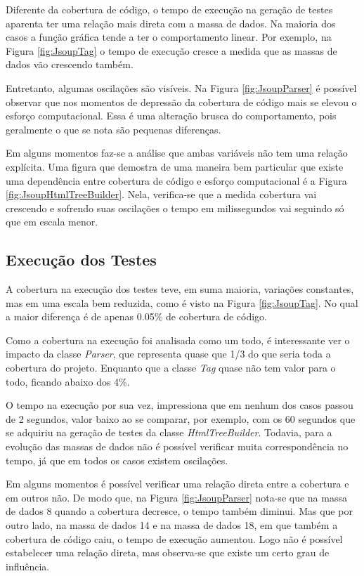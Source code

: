 Diferente da cobertura de código, o tempo de execução na geração de testes aparenta ter uma relação mais direta com a massa de dados. Na maioria dos casos a função gráfica tende a ter o comportamento linear. Por exemplo, na Figura \ref{fig:JsoupTag} o tempo de execução cresce a medida que as massas de dados vão crescendo também.

Entretanto, algumas oscilações são visíveis. Na Figura \ref{fig:JsoupParser} é possível observar que nos momentos de depressão da cobertura de código mais se elevou o esforço computacional. Essa é uma alteração brusca do comportamento, pois geralmente o que se nota são pequenas diferenças.

Em alguns momentos faz-se a análise que ambas variáveis não tem uma relação explícita. Uma figura que demostra de uma maneira bem particular que existe uma dependência entre cobertura de código e esforço computacional é a Figura \ref{fig:JsoupHtmlTreeBuilder}. Nela, verifica-se que a medida cobertura vai crescendo e sofrendo suas oscilações o tempo em milissegundos vai seguindo só que em escala menor.

\subsection{Execução dos Testes}

A cobertura na execução dos testes teve, em suma maioria, variações constantes, mas em uma escala bem reduzida, como é visto na Figura \ref{fig:JsoupTag}. No qual a maior diferença é de apenas 0.05\% de cobertura de código. 

Como a cobertura na execução foi analisada como um todo, é interessante ver o impacto da classe \textit{Parser}, que representa quase que 1/3 do que seria toda a cobertura do projeto. Enquanto que a classe \textit{Tag} quase não tem valor para o todo, ficando abaixo dos 4\%.

O tempo na execução por sua vez, impressiona que em nenhum dos casos passou de 2 segundos, valor baixo ao se comparar, por exemplo, com os 60 segundos que se adquiriu na geração de testes da classe \textit{HtmlTreeBuilder}. Todavia, para a evolução das massas de dados não é possível verificar muita correspondência no tempo, já que em todos os casos existem oscilações.

Em alguns momentos é possível verificar uma relação direta entre a cobertura e em outros não. De modo que, na Figura \ref{fig:JsoupParser} nota-se que na massa de dados 8 quando a cobertura decresce, o tempo também diminui. Mas que por outro lado, na massa de dados 14 e na massa de dados 18, em que também a cobertura de código caiu, o tempo de execução aumentou. Logo não é possível estabelecer uma relação direta, mas observa-se que existe um certo grau de influência.

